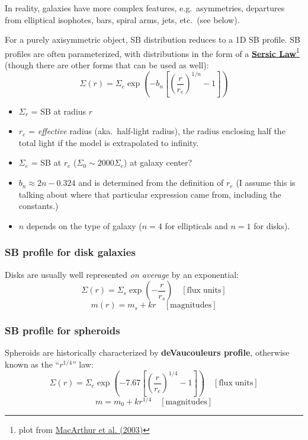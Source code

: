 \documentclass{article}
\newcommand{\mynotes}[1]{\textcolor{cadmiumorange}{#1}}
\begin{document}
In reality, galaxies have more complex features, e.g.\ asymmetries,
departures from elliptical isophotes, bars, spiral arms, jets, etc.\
(see below).

For a purely axisymmetric object, SB distribution reduces to a 1D SB profile.
SB profiles are often parameterized, with distributions in the form
of a
\href{http://astronomy.nmsu.edu/holtz/a555/html/diagrams/a616/sersic.htm}
{\textbf{Sersic Law}}\footnote{plot from
\href{http://adsabs.harvard.edu/abs/2003ApJ...582..689M}
{MacArthur et al. (2003)}}
(though there are other forms that can be used as well):
\[
    \Sigma(r) = \Sigma_e\exp\left(-b_n\left[\left(
    \frac{r}{r_e}\right)^{1/n}-1\right]\right)
\]
\begin{itemize}
    \item $\Sigma_{r}$ = SB at radius $r$
    \item $r_{e}$ = \textit{effective} radius (aka.\ half-light radius),
        the radius enclosing half the
        total light if the model is extrapolated to infinity.
    \item $\Sigma_{e}$ = SB at $r_{e}$
        ($\Sigma_{0} \sim 2000\Sigma_{e}$) \mynotes{at galaxy center?}
    \item $b_{n} \approx 2n - 0.324$ and is determined from the definition of
        $r_{e}$ \mynotes{(I assume this is talking about where that particular
        expression came from, including the constants.)}
    \item $n$ depends on the type of galaxy ($n=4$ for ellipticals and $n=1$
        for disks).
\end{itemize}
\subsubsection{SB profile for disk galaxies}
Disks are usually well represented \emph{on average} by an exponential:
\[
    \Sigma(r) = \Sigma_{s}\exp\left(-\frac{r}{r_{s}}\right)
    \quad\mathrm{[flux\;units]}
    \]
\[
    m(r) = m_{s} + kr
    \quad\mathrm{[magnitudes]}
    \]

\subsubsection{SB profile for spheroids}
Spheroids are historically characterized by
\textbf{deVaucouleurs profile}, otherwise known as the ``$r^{1/4}$'' law:
\[
    \Sigma(r) = \Sigma_e\exp\left(-7.67\left[\left(
    \frac{r}{r_e}\right)^{1/4}-1\right] \right)
    \quad\mathrm{[flux\;units]}
    \]
\[
    m = m_{0} + kr^{1/4}
    \quad\mathrm{[magnitudes]}
    \]
\end{document}
